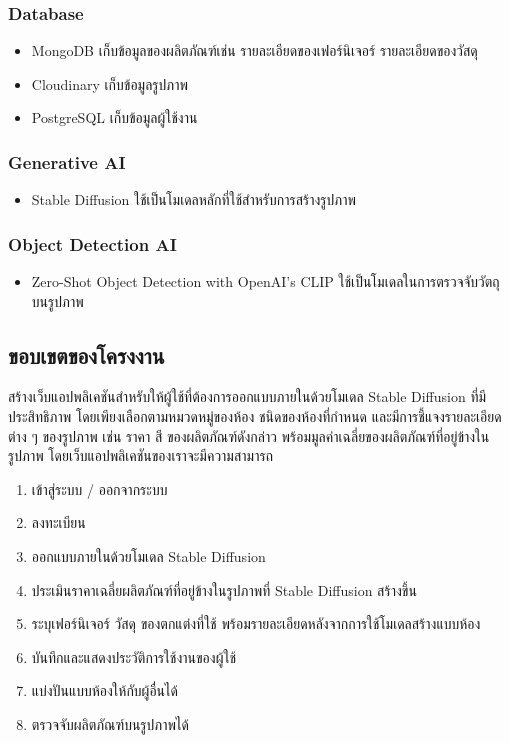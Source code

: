 \documentclass[12pt,oneside,openright,a4paper]{cpe-thai-project}
\begin{document}
\subsubsection{Database}
\begin{itemize}
\item MongoDB เก็บข้อมูลของผลิตภัณฑ์เช่น รายละเอียดของเฟอร์นิเจอร์ รายละเอียดของวัสดุ
\item Cloudinary เก็บข้อมูลรูปภาพ
\item PostgreSQL เก็บข้อมูลผู้ใช้งาน
\end{itemize}

\subsubsection{Generative AI}
\begin{itemize}
\item Stable Diffusion ใช้เป็นโมเดลหลักที่ใช้สำหรับการสร้างรูปภาพ
\end{itemize}

\subsubsection{Object Detection AI}
\begin{itemize}
\item Zero-Shot Object Detection with OpenAI’s CLIP ใช้เป็นโมเดลในการตรวจจับวัตถุบนรูปภาพ
\end{itemize}

\subsection{ขอบเขตของโครงงาน}
\hspace {18pt} สร้างเว็บแอปพลิเคชันสำหรับให้ผู้ใช้ที่ต้องการออกแบบภายในด้วยโมเดล Stable Diffusion ที่มีประสิทธิภาพ โดยเพียงเลือกตามหมวดหมู่ของห้อง ชนิดของห้องที่กำหนด และมีการชี้แจงรายละเอียดต่าง ๆ ของรูปภาพ เช่น ราคา สี ของผลิตภัณฑ์ดังกล่าว พร้อมมูลค่าเฉลี่ยของผลิตภัณฑ์ที่อยู่ข้างในรูปภาพ
โดยเว็บแอปพลิเคชันของเราจะมีความสามารถ
\begin{enumerate}
\item เข้าสู่ระบบ / ออกจากระบบ
\item ลงทะเบียน
\item ออกแบบภายในด้วยโมเดล Stable Diffusion
\item ประเมินราคาเฉลี่ยผลิตภัณฑ์ที่อยู่ข้างในรูปภาพที่ Stable Diffusion สร้างขึ้น
\item ระบุเฟอร์นิเจอร์ วัสดุ ของตกแต่งที่ใช้ พร้อมรายละเอียดหลังจากการใช้โมเดลสร้างแบบห้อง
\item บันทึกและแสดงประวัติการใช้งานของผู้ใช้
\item แบ่งปันแบบห้องให้กับผู้อื่นได้
\item ตรวจจับผลิตภัณฑ์บนรูปภาพได้
\end{enumerate}
\end{document}
